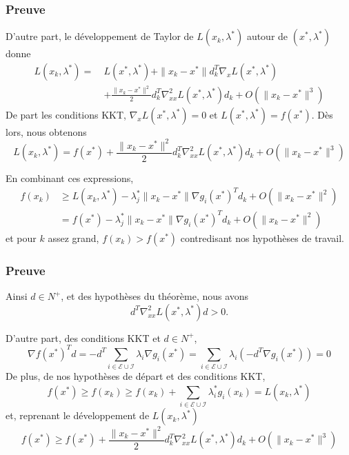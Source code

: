 \documentclass[usepdftitle=false]{beamer}
\def\cE{\mathcal{E}}
\def\cI{\mathcal{I}}
\begin{document}
\begin{frame}
\frametitle{Preuve}

D'autre part, le développement de Taylor de $L(x_k,\lambda^*)$ autour de $(x^*, \lambda^*)$ donne
\begin{align*}
L(x_k,\lambda^*) =\ & L(x^*,\lambda^*) + \| x_k - x^* \| d_k^T \nabla_x L(x^*,\lambda^*)
\\ & + \frac{ \| x_k - x^* \|^2 }{2} d_k^T \nabla^2_{xx} L(x^*,\lambda^*) d_k + O( \| x_k - x^* \|^3 )
\end{align*}
De part les conditions KKT, $\nabla_x L(x^*,\lambda^*) = 0$ et $L(x^*, \lambda^*) = f(x^*)$.
Dès lors, nous obtenons
$$
L(x_k,\lambda^*) = f(x^*) + \frac{ \| x_k - x^* \|^2 }{2} d_k^T \nabla^2_{xx} L(x^*,\lambda^*) d_k + O( \| x_k - x^* \|^3 )
$$

\mbox{}

En combinant ces expressions,
\begin{align*}
f(x_k) & \geq L(x_k, \lambda^*) - \lambda_j^*\| x_k - x^* \|\nabla g_i(x^*)^Td_k + O(\| x_k - x^* \|^2) \\
&= f(x^*) - \lambda_j^*\| x_k - x^* \|\nabla g_i(x^*)^Td_k + O(\| x_k - x^* \|^2)
\end{align*}
et pour $k$ assez grand, $f(x_k) > f(x^*)$ contredisant nos hypothèses de travail.
\end{frame}

\begin{frame}
\frametitle{Preuve}

Ainsi $d \in N^+$, et des hypothèses du théorème, nous avons 
$$
d^T \nabla_{xx}^2 L(x^*, \lambda^*) d > 0.
$$



D'autre part, des conditions KKT et $d \in N^+$,
$$
\nabla f(x^*)^Td = -d^T\sum_{i \in \cE \cup \cI} \lambda_i \nabla g_i(x^*)
= \sum_{i \in \cE \cup \cI} \lambda_i (-d^T \nabla g_i(x^*)) = 0
$$
De plus, de nos hypothèses de départ et des conditions KKT,
$$
f(x^*) \geq f(x_k) \geq f(x_k) + \sum_{i \in \cE \cup \cI} \lambda_i^* g_i(x_k) = L(x_k,\lambda^*)
$$
et, reprenant le développement de $L(x_k,\lambda^*)$
$$
f(x^*) \geq f(x^*) + \frac{ \| x_k - x^* \|^2 }{2} d_k^T \nabla^2_{xx} L(x^*,\lambda^*) d_k + O( \| x_k - x^* \|^3 )
$$
\end{frame}
\end{document}
